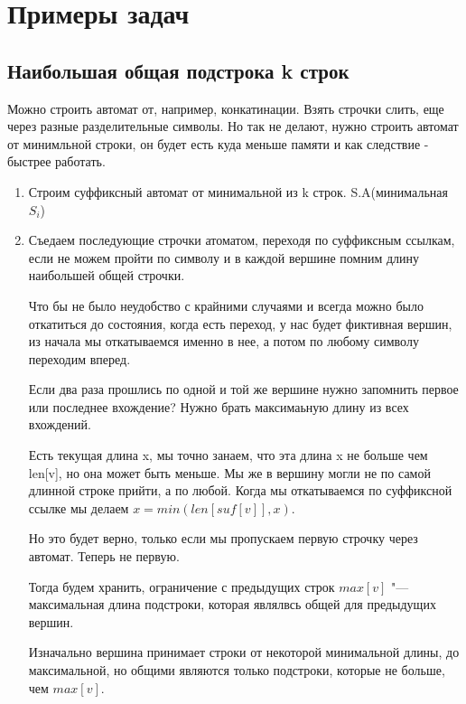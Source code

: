 \section{Примеры задач}
\subsection{Наибольшая общая подстрока k строк}
    Можно строить автомат от, например, конкатинации. Взять 
    строчки слить, еще через разные разделительные символы. Но так не 
    делают, нужно строить автомат от минимльной строки, он будет есть 
    куда меньше памяти и как следствие - быстрее работать. 
    
    \begin{enumerate}
    \item Строим суффиксный автомат от минимальной из k строк. S.A(минимальная $S_i$)
    
    \item  %
    
    Съедаем последующие строчки атоматом, переходя по суффиксным ссылкам, если не 
    можем пройти по символу и в каждой вершине помним длину наибольшей общей строчки. 

    Что бы не было неудобство с крайними случаями и всегда можно было откатиться 
    до состояния, когда есть переход, у нас будет фиктивная вершин, из начала мы откатываемся 
    именно в нее, а потом по любому символу переходим вперед. 
    
    Если два раза прошлись по одной и той же вершине нужно запомнить первое или последнее вхождение?
    Нужно брать максимаьную длину из всех вхождений. 
    
    Есть текущая длина x, мы точно занаем, что эта длина x не больше
    чем len[v], но она может быть меньше. Мы же в вершину могли
    не по самой длинной строке прийти, а по любой. Когда мы
    откатываемся по суффиксной ссылке мы делаем $x = min(len[suf[v]], x)$. 

    Но это будет верно, только если мы пропускаем первую строчку через автомат. 
    Теперь не первую. 

    Тогда будем хранить, ограничение с предыдущих строк $max[v]$ "--- максимальная длина 
    подстроки, которая являлвсь общей для предыдущих вершин. 

    Изначально вершина принимает строки от некоторой 
    минимальной длины, до максимальной, но общими являются только подстроки, 
    которые не больше, чем $max[v]$.


\end{enumerate}
